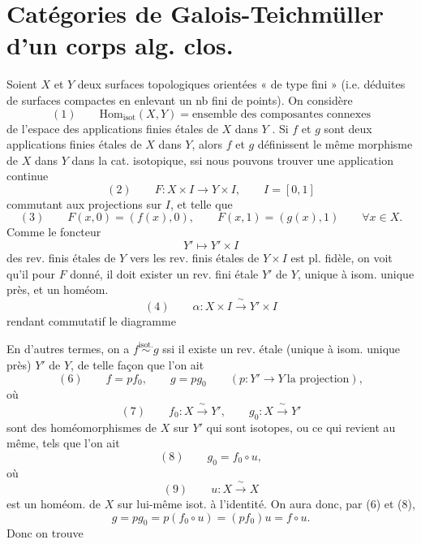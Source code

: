 \documentclass[11pt,a4paper]{article}
\begin{document}
\section{Catégories de Galois-Teichmüller d'un corps alg. clos.}

Soient $X$ et $Y$ deux surfaces topologiques  orientées « de type fini » (i.e. déduites de surfaces compactes en enlevant un nb fini de points). On considère
\[
  (1)\qquad \mathrm{Hom}_{\mathrm{isot}}(X,Y)=\text{ensemble des composantes connexes}
\]
 de l'espace des applications finies étales de $X$ dans $Y$ . Si $f$ et $g$ sont deux applications finies étales de $X$ dans $Y$, alors $f$ et $g$  définissent le même  morphisme de $X$ dans $Y$ dans la cat. isotopique, ssi nous pouvons trouver une application continue  
\[
  (2)\qquad F\colon X\times I\longrightarrow Y\times I,\qquad I=[0,1]
\]
commutant aux projections sur $I$, et telle que
\[
  (3)\qquad F(x,0)=(f(x),0),\qquad F(x,1)=(g(x),1)\qquad\forall x\in X .
\]
Comme le foncteur
\[
  Y'\longmapsto Y'\times I
\]
des rev. finis étales de $Y$ vers les rev. finis étales de $Y\times I$ est pl. fidèle, on voit qu'il  pour $F$ donné, il doit exister un rev. fini étale $Y'$ de $Y$, unique à isom. unique près, et un homéom.
\[
  (4)\qquad \alpha\colon X\times I\xrightarrow{\ \sim\ }Y'\times I
\]
rendant commutatif le diagramme




En d'autres termes, on a $f\overset{\text{isot.}}{\sim}g$ ssi il existe un rev.  étale (unique à isom. unique près) $Y'$ de $Y$, de telle façon que l'on ait
\[
  (6)\qquad f=pf_{0},\qquad g=pg_{0}\qquad (p\colon Y'\to Y\ \text{la projection}),
\]
où
\[
  (7)\qquad f_{0}\colon X\xrightarrow{\ \sim\ }Y',\qquad g_{0}\colon X\xrightarrow{\ \sim\ }Y'
\]
sont des homéomorphismes de $X$ sur $Y'$ qui sont isotopes, ou ce qui revient au même, tels que l'on ait
\[
  (8)\qquad g_{0}=f_{0}\circ u,
\]
où
\[
  (9)\qquad u\colon X\xrightarrow{\ \sim\ }X
\]
est un homéom. de $X$ sur lui-même isot. à l'identité. On aura donc, par (6) et (8),
\[
  g=pg_{0}=p(f_{0}\circ u)=(pf_{0})u=f\circ u .
\]
Donc on trouve
\end{document}
